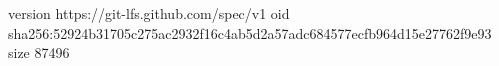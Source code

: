 version https://git-lfs.github.com/spec/v1
oid sha256:52924b31705c275ac2932f16c4ab5d2a57adc684577ecfb964d15e27762f9e93
size 87496
